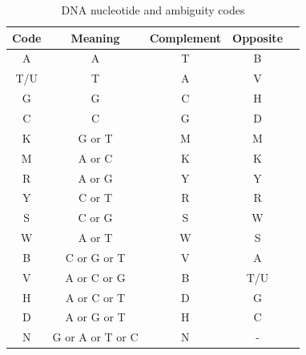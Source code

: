 \documentclass[phd,tocprelim]{cornell}
\begin{document}
\begin{table}[htp]
\caption{DNA nucleotide and ambiguity codes}
\label{ambcodes}
\begin{center}
    \begin{tabular}{c|c|c|c|c}
        Code & Meaning & Complement & Opposite \\
        \hline
        {\color{red} A} & {\color{red} A} & {\color{blue} T} & B \\
        {\color{blue} T}/U & {\color{blue} T} & {\color{red} A} & V \\
        {\color{orange} G} & {\color{orange} G} & {\color{MyDarkGreen} C} & H \\
        {\color{MyDarkGreen} C} & {\color{MyDarkGreen} C} & {\color{orange} G} & D \\
        K & {\color{orange} G} or {\color{blue} T} & M & M \\
        M & {\color{red} A} or {\color{MyDarkGreen} C} & K & K \\
        R & {\color{red} A} or {\color{orange} G} & Y & Y \\
        Y & {\color{MyDarkGreen} C} or {\color{blue} T} & R & R \\
        S & {\color{MyDarkGreen} C} or {\color{orange} G} & S & W \\
        W & {\color{red} A} or {\color{blue} T} & W & S \\
        B & {\color{MyDarkGreen} C} or {\color{orange} G} or {\color{blue} T} & V & {\color{red} A} \\
        V & {\color{red} A} or {\color{MyDarkGreen} C} or {\color{orange} G} & B & {\color{blue} T}/U \\
        H & {\color{red} A} or {\color{MyDarkGreen} C} or {\color{blue} T} & D & {\color{orange} G} \\
        D & {\color{red} A} or {\color{orange} G} or {\color{blue} T} & H & {\color{MyDarkGreen} C} \\
        N & {\color{orange} G} or {\color{red} A} or {\color{blue} T} or {\color{MyDarkGreen} C} & N & -
    \end{tabular}\
\end{center}
\end{table}
\end{document}
